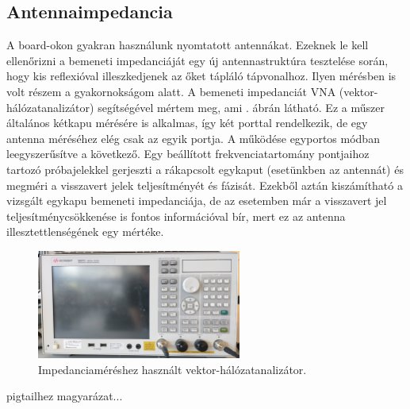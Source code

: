         \subsection{Antennaimpedancia}
            A board-okon gyakran használunk nyomtatott antennákat. Ezeknek le kell ellenőrizni a bemeneti impedanciáját egy új antennastruktúra tesztelése során, hogy kis reflexióval illeszkedjenek az őket tápláló tápvonalhoz. Ilyen mérésben is volt részem a gyakornokságom alatt. A bemeneti impedanciát VNA (vektor-hálózatanalizátor) segítségével mértem meg, ami . ábrán látható. Ez a műszer általános kétkapu mérésére is alkalmas, így két porttal rendelkezik, de egy antenna méréséhez elég csak az egyik portja. A működése egyportos módban leegyszerűsítve a következő. Egy beállított frekvenciatartomány pontjaihoz tartozó próbajelekkel gerjeszti a rákapcsolt egykaput (esetünkben az antennát) és megméri a visszavert jelek teljesítményét és fázisát. Ezekből aztán kiszámítható a vizsgált egykapu bemeneti impedanciája, de az esetemben már a visszavert jel teljesítménycsökkenése is fontos információval bír, mert ez az antenna illesztettlenségének egy mértéke.
%
%
%
            \begin{figure}
                \centering
                \includegraphics[width=0.6\textwidth]{kep/szerkesztett/vna.jpg}
                \caption{Impedanciaméréshez használt vektor-hálózatanalizátor.}
                \label{fig:vna}
            \end{figure}
%
            \par
            pigtailhez magyarázat...

